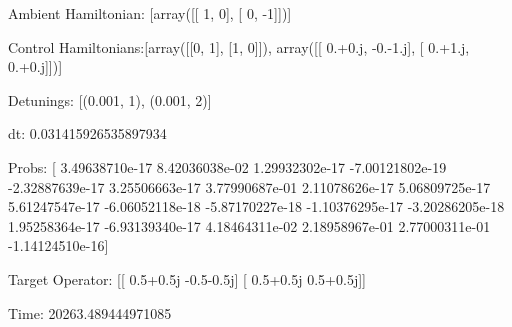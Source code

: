 \documentclass{article}
\begin{document}
    

\newpage

Ambient Hamiltonian: [array([[ 1,  0],
       [ 0, -1]])]

Control Hamiltonians:[array([[0, 1],
       [1, 0]]), array([[ 0.+0.j, -0.-1.j],
       [ 0.+1.j,  0.+0.j]])]

Detunings: [(0.001, 1), (0.001, 2)]

 dt: 0.031415926535897934

Probs: [  3.49638710e-17   8.42036038e-02   1.29932302e-17  -7.00121802e-19
  -2.32887639e-17   3.25506663e-17   3.77990687e-01   2.11078626e-17
   5.06809725e-17   5.61247547e-17  -6.06052118e-18  -5.87170227e-18
  -1.10376295e-17  -3.20286205e-18   1.95258364e-17  -6.93139340e-17
   4.18464311e-02   2.18958967e-01   2.77000311e-01  -1.14124510e-16]

Target Operator: [[ 0.5+0.5j -0.5-0.5j]
 [ 0.5+0.5j  0.5+0.5j]]

Time: 20263.489444971085
\end{document}
